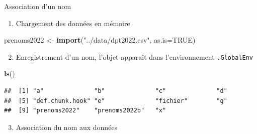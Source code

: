 \documentclass[
  ignorenonframetext,
]{beamer}
\newenvironment{Shaded}{\begin{snugshade}}{\end{snugshade}}
\newcommand{\AttributeTok}[1]{\textcolor[rgb]{0.13,0.29,0.53}{#1}}
\newcommand{\ConstantTok}[1]{\textcolor[rgb]{0.56,0.35,0.01}{#1}}
\newcommand{\FunctionTok}[1]{\textcolor[rgb]{0.13,0.29,0.53}{\textbf{#1}}}
\newcommand{\NormalTok}[1]{#1}
\newcommand{\OtherTok}[1]{\textcolor[rgb]{0.56,0.35,0.01}{#1}}
\newcommand{\StringTok}[1]{\textcolor[rgb]{0.31,0.60,0.02}{#1}}
\providecommand{\tightlist}{%
  \setlength{\itemsep}{0pt}\setlength{\parskip}{0pt}}
\begin{document}
\begin{frame}[fragile]{Association d'un nom}
\protect\hypertarget{association-dun-nom}{}
\begin{enumerate}
\tightlist
\item
  Chargement des données en mémoire
\end{enumerate}

\tiny

\begin{Shaded}
\begin{Highlighting}[]
\NormalTok{prenoms2022 }\OtherTok{\textless{}{-}} \FunctionTok{import}\NormalTok{(}\StringTok{"../data/dpt2022.csv"}\NormalTok{, }\AttributeTok{as.is=}\ConstantTok{TRUE}\NormalTok{)}
\end{Highlighting}
\end{Shaded}

\normalsize

\begin{enumerate}
\setcounter{enumi}{1}
\tightlist
\item
  Enregistrement d'un nom, l'objet apparaît dans l'environnement
  \texttt{.GlobalEnv}
\end{enumerate}

\tiny

\begin{Shaded}
\begin{Highlighting}[]
\FunctionTok{ls}\NormalTok{()}
\end{Highlighting}
\end{Shaded}

\begin{verbatim}
##  [1] "a"              "b"              "c"              "d"             
##  [5] "def.chunk.hook" "e"              "fichier"        "g"             
##  [9] "prenoms2022"    "prenoms2022b"   "x"
\end{verbatim}

\normalsize

\begin{enumerate}
\setcounter{enumi}{2}
\tightlist
\item
  Association du nom aux données
\end{enumerate}
\end{frame}
\end{document}
